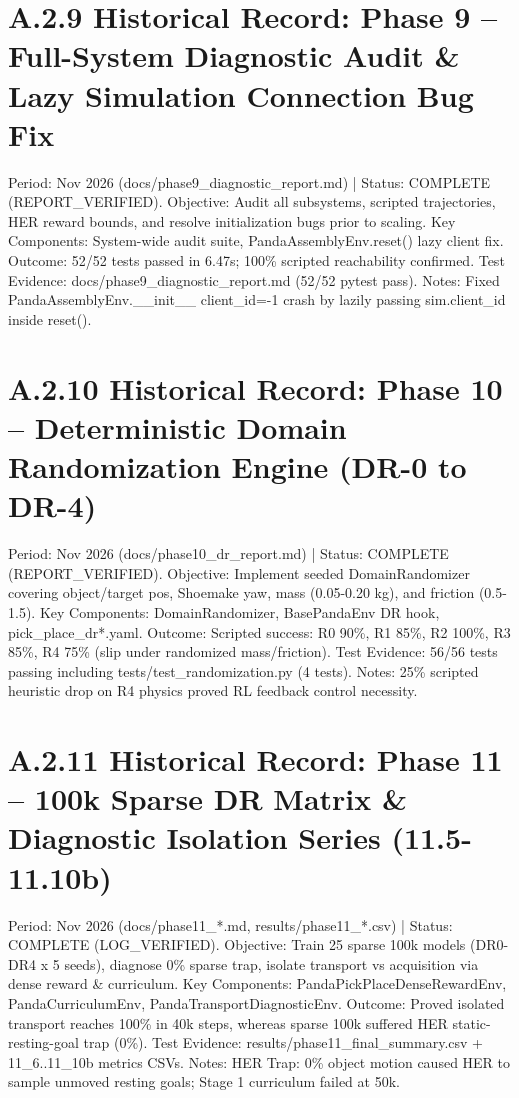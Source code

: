 \documentclass[11pt,a4paper,oneside]{book}
\begin{document}
\section{A.2.9 Historical Record: Phase 9 -- Full-System Diagnostic Audit \& Lazy Simulation Connection Bug Fix}
Period: Nov 2026 (docs/phase9\_diagnostic\_report.md) | Status: COMPLETE (REPORT\_VERIFIED). Objective: Audit all subsystems, scripted trajectories, HER reward bounds, and resolve initialization bugs prior to scaling. Key Components: System-wide audit suite, PandaAssemblyEnv.reset() lazy client fix. Outcome: 52/52 tests passed in 6.47s; 100\% scripted reachability confirmed. Test Evidence: docs/phase9\_diagnostic\_report.md (52/52 pytest pass). Notes: Fixed PandaAssemblyEnv.\_\_init\_\_ client\_id=-1 crash by lazily passing sim.client\_id inside reset().

\section{A.2.10 Historical Record: Phase 10 -- Deterministic Domain Randomization Engine (DR-0 to DR-4)}
Period: Nov 2026 (docs/phase10\_dr\_report.md) | Status: COMPLETE (REPORT\_VERIFIED). Objective: Implement seeded DomainRandomizer covering object/target pos, Shoemake yaw, mass (0.05-0.20 kg), and friction (0.5-1.5). Key Components: DomainRandomizer, BasePandaEnv DR hook, pick\_place\_dr*.yaml. Outcome: Scripted success: R0 90\%, R1 85\%, R2 100\%, R3 85\%, R4 75\% (slip under randomized mass/friction). Test Evidence: 56/56 tests passing including tests/test\_randomization.py (4 tests). Notes: 25\% scripted heuristic drop on R4 physics proved RL feedback control necessity.

\section{A.2.11 Historical Record: Phase 11 -- 100k Sparse DR Matrix \& Diagnostic Isolation Series (11.5-11.10b)}
Period: Nov 2026 (docs/phase11\_*.md, results/phase11\_*.csv) | Status: COMPLETE (LOG\_VERIFIED). Objective: Train 25 sparse 100k models (DR0-DR4 x 5 seeds), diagnose 0\% sparse trap, isolate transport vs acquisition via dense reward \& curriculum. Key Components: PandaPickPlaceDenseRewardEnv, PandaCurriculumEnv, PandaTransportDiagnosticEnv. Outcome: Proved isolated transport reaches 100\% in 40k steps, whereas sparse 100k suffered HER static-resting-goal trap (0\%). Test Evidence: results/phase11\_final\_summary.csv + 11\_6..11\_10b metrics CSVs. Notes: HER Trap: 0\% object motion caused HER to sample unmoved resting goals; Stage 1 curriculum failed at 50k.
\end{document}
